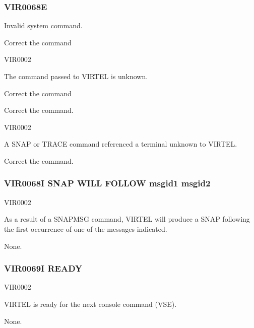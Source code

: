 \documentclass[letterpaper,10pt,english]{sphinxmanual}
\begin{document}
\subsubsection{VIR0068E}
\label{\detokenize{messages:vir0068e}}
\sphinxAtStartPar
Invalid system command.
\begin{description}
\sphinxAtStartPar
Correct the command

\sphinxAtStartPar
VIR0002

\sphinxAtStartPar
The command passed to VIRTEL is unknown.

\sphinxAtStartPar
Correct the command

\sphinxAtStartPar
Correct the command.

\sphinxAtStartPar
VIR0002

\sphinxAtStartPar
A SNAP or TRACE command referenced a terminal unknown to VIRTEL.

\sphinxAtStartPar
Correct the command.

\end{description}


\subsubsection{VIR0068I SNAP WILL FOLLOW msgid1 msgid2}
\label{\detokenize{messages:vir0068i-snap-will-follow-msgid1-msgid2}}\begin{description}
\sphinxAtStartPar
VIR0002

\sphinxAtStartPar
As a result of a SNAPMSG command, VIRTEL will produce a SNAP following the first occurrence of one of the messages indicated.

\sphinxAtStartPar
None.

\end{description}


\subsubsection{VIR0069I READY}
\label{\detokenize{messages:vir0069i-ready}}\begin{description}
\sphinxAtStartPar
VIR0002

\sphinxAtStartPar
VIRTEL is ready for the next console command (VSE).

\sphinxAtStartPar
None.

\end{description}
\end{document}
